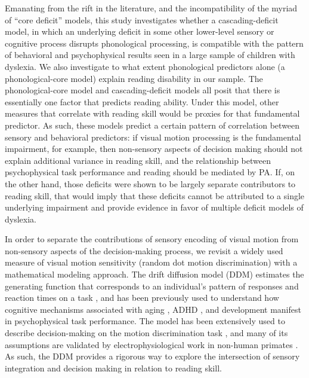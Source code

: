 \documentclass[../uwthesis.tex]{subfiles}
\begin{document}
Emanating from the rift in the literature, and the incompatibility of the myriad of “core deficit” models, this study investigates whether a cascading-deficit model, in which an underlying deficit in some other lower-level sensory or cognitive process disrupts phonological processing, is compatible with the pattern of behavioral and psychophysical results seen in a large sample of children with dyslexia. We also investigate to what extent phonological predictors alone (a phonological-core model) explain reading disability in our sample. The phonological-core model and cascading-deficit models all posit that there is essentially one factor that predicts reading ability. Under this model, other measures that correlate with reading skill would be proxies for that fundamental predictor. As such, these models predict a certain pattern of correlation between sensory and behavioral predictors: if visual motion processing is the fundamental impairment, for example, then non-sensory aspects of decision making should not explain additional variance in reading skill, and the relationship between psychophysical task performance and reading should be mediated by PA. If, on the other hand, those deficits were shown to be largely separate contributors to reading skill, that would imply that these deficits cannot be attributed to a single underlying impairment and provide evidence in favor of multiple deficit models of dyslexia.

In order to separate the contributions of sensory encoding of visual motion from non-sensory aspects of the decision-making process, we revisit a widely used measure of visual motion sensitivity (random dot motion discrimination) with a mathematical modeling approach. The drift diffusion model (DDM) estimates the generating function that corresponds to an individual’s pattern of responses and reaction times on a task \cite{Ratcliff2008TheTasks}, and has been previously used to understand how cognitive mechanisms associated with aging \cite{Ratcliff2004ATask}, ADHD \cite{Huang-Pollock2017UsingDisorder}, and development \cite{Ratcliff2012ChildrenResponses} manifest in psychophysical task performance. The model has been extensively used to describe decision-making on the motion discrimination task \cite{Gold2007TheMaking.,Palmer2005TheDecision,Shadlen2013ThePrimer}, and many of its assumptions are validated by electrophysiological work in non-human primates \cite{Shadlen2001NeuralMonkey}. As such, the DDM provides a rigorous way to explore the intersection of sensory integration and decision making in relation to reading skill.
\end{document}
